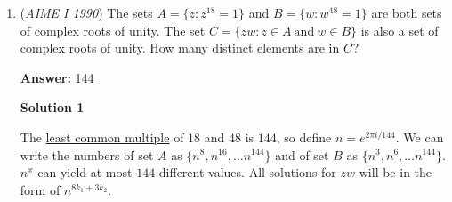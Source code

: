 \begin{enumerate}
 Thus, $S_n = S_{n-1} + S_{n-2}$. By counting, we can establish that $S_1 = 2$ and $S_2 = 3$. Therefore, $S_3 = 5,\ S_4 = 8$, forming the \href{https://artofproblemsolving.com/wiki/index.php?title=Fibonacci\_sequence}{Fibonacci sequence}. Listing them out, we get $2,3,5,8,13,21,34,55,89,144$, and the 10th number is $144$. Putting this over $2^{10}$ to find the probability, we get $\frac{9}{64}$. Our solution is $9+64=\boxed{073}$.

 



\textbf{Solution 3 (basically the first solution)}

We can also split the problem into casework.

 Case 1: 0 Heads

 There is only one possibility.

 Case 2: 1 Head

 There are 10 possibilities.

 Case 3: 2 Heads

 There are 36 possibilities.

 Case 4: 3 Heads

 There are 56 possibilities.

 Case 5: 4 Heads

 There are 35 possibilities.

 Case 6: 5 Heads

 There are 6 possibilities.

 We have $1+10+36+56+35+6=144$, and there are $1024$ possible outcomes, so the probability is $\frac{144}{1024}=\frac{9}{64}$, and the answer is $\boxed{073}$.

 $\textbf{-RootThreeOverTwo}$



	\item (\textit{AIME I 1990}) The sets $A = \{z : z^{18} = 1\}$ and $B = \{w : w^{48} = 1\}$ are both sets of complex roots of unity.  The set $C = \{zw : z \in A ~ \mbox{and} ~ w \in B\}$ is also a set of complex roots of unity.  How many distinct elements are in $C^{}_{}$?


 
 \textbf{Answer: }144



\textbf{Solution 1}

The \href{https://artofproblemsolving.com/wiki/index.php?title=Least\_common\_multiple}{least common multiple} of $18$ and $48$ is $144$, so define $n = e^{2\pi i/144}$. We can write the numbers of set $A$ as $\{n^8, n^{16}, \ldots n^{144}\}$ and of set $B$ as $\{n^3, n^6, \ldots n^{144}\}$. $n^x$ can yield at most $144$ different values. All solutions for $zw$ will be in the form of $n^{8k_1 + 3k_2}$. 


\end{enumerate}
